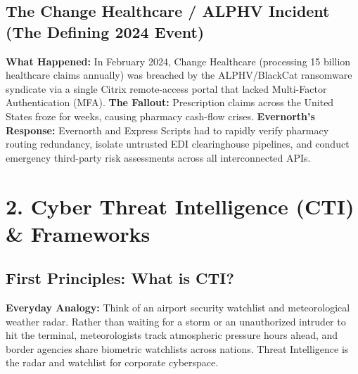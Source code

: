 \documentclass[10pt,a4paper]{article}
\begin{document}
\subsection{The Change Healthcare / ALPHV Incident (The Defining 2024 Event)}
\textbf{What Happened:} In February 2024, Change Healthcare (processing 15 billion healthcare claims annually) was breached by the ALPHV/BlackCat ransomware syndicate via a single Citrix remote-access portal that lacked Multi-Factor Authentication (MFA). 
\textbf{The Fallout:} Prescription claims across the United States froze for weeks, causing pharmacy cash-flow crises. 
\textbf{Evernorth's Response:} Evernorth and Express Scripts had to rapidly verify pharmacy routing redundancy, isolate untrusted EDI clearinghouse pipelines, and conduct emergency third-party risk assessments across all interconnected APIs.

\section{2. Cyber Threat Intelligence (CTI) \& Frameworks}

\subsection{First Principles: What is CTI?}
\textbf{Everyday Analogy:} Think of an airport security watchlist and meteorological weather radar. Rather than waiting for a storm or an unauthorized intruder to hit the terminal, meteorologists track atmospheric pressure hours ahead, and border agencies share biometric watchlists across nations. Threat Intelligence is the radar and watchlist for corporate cyberspace.
\end{document}
